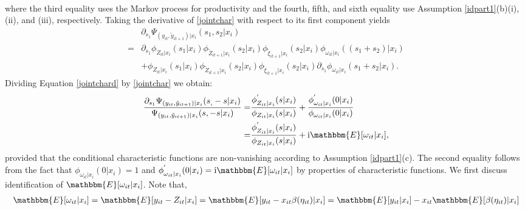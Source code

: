 \documentclass[12pt]{article}
\begin{document}
\begin{appendices}
\begin{equation}
\begin{split}
\end{split}
\end{equation}
where the third equality uses the Markov process for productivity and the fourth, fifth, and sixth equality use Assumption \ref{idpart1}(b)(i), (ii), and (iii), respectively. Taking the derivative of \eqref{jointchar} with respect to its first component yields
\begin{equation} \label{jointchard}
\begin{split}
&\partial_{s_{1}}\Psi_{(y_{it}, \tilde{y}_{it+1})|x_{i}}(s_{1}, s_{2}|x_{i})\\
=&\partial_{s_{1}}\phi_{Z_{it}|x_{i}}(s_{1}|x_{i})\phi_{\tilde{Z}_{it+1}|x_{i}}(s_{2}|x_{i})\phi_{\tilde{\xi}_{it+1}|x_{i}}(s_{2}|x_{i})\phi_{\omega_{it}|x_{i}}((s_{1}+s_{2})|x_{i})\\
&+\phi_{Z_{it}|x_{i}}(s_{1}|x_{i})\phi_{\tilde{Z}_{it+1}|x_{i}}(s_{2}|x_{i})\phi_{\tilde{\xi}_{it+1}|x_{i}}(s_{2}|x_{i})\partial_{s_{1}}\phi_{\omega_{it}|x_{i}}(s_{1}+s_{2}|x_{i}).
\end{split}
\end{equation}
Dividing Equation \eqref{jointchard} by \eqref{jointchar} we obtain:
\begin{equation*}
\begin{split}
\frac{\partial_{s_{1}}\Psi_{(y_{it}, \tilde{y}_{it+1})|x_{i}}(s_, -s|x_{i})}{\Psi_{(y_{it}, \tilde{y}_{it+1})|x_{i}}(s, -s|x_{i})}=&\frac{\phi^{'}_{Z_{it}|x_{i}}(s|x_{i})}{\phi_{Z_{it}|x_{i}}(s|x_{i})}+\frac{\phi^{'}_{\omega_{it}|x_{i}}(0|x_{i})}{\phi_{\omega_{it}|x_{i}}(0|x_{i})}\\
=&\frac{\phi^{'}_{Z_{it}|x_{i}}(s|x_{i})}{\phi_{Z_{it}|x_{i}}(s|x_{i})}+\mathrm{i}\mathbbm{E}[\omega_{it}|x_{i}],
\end{split}
\end{equation*}
provided that the conditional characteristic functions are non-vanishing according to Assumption \ref{idpart1}(c). The second equality follows from the fact that $\phi_{\omega_{it}|x_{i}}(0|x_{i})=1$ and $\phi^{'}_{\omega_{it}|x_{i}}(0|x_{i})=\mathrm{i}\mathbbm{E}[\omega_{it}|x_{i}]$ by properties of characteristic functions. We first discuss identification of $\mathbbm{E}[\omega_{it}|x_{i}]$. Note that,
\begin{equation*}
\begin{split}
\mathbbm{E}[\omega_{it}|x_{i}]&=\mathbbm{E}[y_{it}-Z_{it}|x_{i}]=\mathbbm{E}[y_{it}-x_{it}\beta(\eta_{it})|x_{i}]=\mathbbm{E}[y_{it}|x_{i}]-x_{it}\mathbbm{E}[\beta(\eta_{it})|x_{i}]\\

\end{split}
\end{equation*}
\end{appendices}
\end{document}

